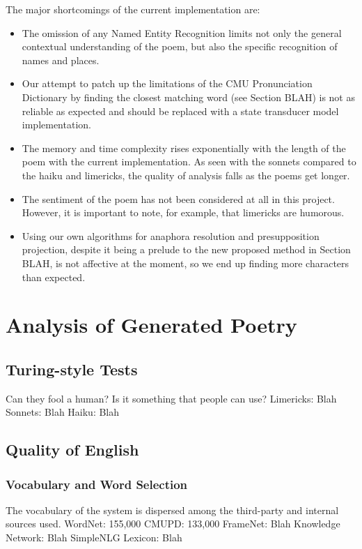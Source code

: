 The major shortcomings of the current implementation are:
\begin{itemize}
\item{The omission of any Named Entity Recognition limits not only the general contextual understanding of the poem, but also the specific recognition of names and places.}
\item{Our attempt to patch up the limitations of the CMU Pronunciation Dictionary by finding the closest matching word (see Section BLAH) is not as reliable as expected and should be replaced with a state transducer model implementation.}
\item{The memory and time complexity rises exponentially with the length of the poem with the current implementation. As seen with the sonnets compared to the haiku and limericks, the quality of analysis falls as the poems get longer.}
\item{The sentiment of the poem has not been considered at all in this project. However, it is important to note, for example, that limericks are humorous.}
\item{Using our own algorithms for anaphora resolution and presupposition projection, despite it being a prelude to the new proposed method in Section BLAH, is not affective at the moment, so we end up finding more characters than expected.}
\end{itemize}


\section{Analysis of Generated Poetry}


\subsection{Turing-style Tests}
Can they fool a human?
Is it something that people can use?
Limericks: Blah
Sonnets: Blah
Haiku: Blah


\subsection{Quality of English}

\subsubsection{Vocabulary and Word Selection}
The vocabulary of the system is dispersed among the third-party and internal sources used.
WordNet: 155,000
CMUPD: 133,000
FrameNet: Blah
Knowledge Network: Blah
SimpleNLG Lexicon: Blah

